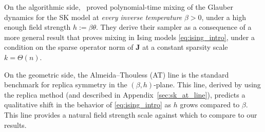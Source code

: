 \documentclass[11pt]{article}
\newcommand{\defeq}{:=}
\newcommand{\1}{\mathbf{1}}
\newcommand{\0}{\mathbf{0}}
\newcommand{\mj}{{\mathbf{J}}}
\newcommand{\vh}{{\mathbf{h}}}
\begin{document}
On the
algorithmic side,~\cite{BandeiraElAlaouiRodder26} proved polynomial-time
mixing of the Glauber dynamics for the SK model at \emph{every inverse temperature} $\beta > 0$, under a high enough field strength $h \defeq \beta\theta$. They derive their sampler as a consequence of a more general result that proves mixing in Ising models \eqref{eq:ising_intro},
under a condition on the sparse operator norm of $\mj$ at a constant sparsity scale $k = \Theta(n)$.

On the geometric side, the Almeida--Thouless (AT) line is the
standard benchmark for replica symmetry in the
\((\beta,h)\)-plane. This line, derived by \cite{deAlmeidaThouless78} using the replica method (and described in Appendix~\ref{sec:sk_at_line}), predicts a qualitative shift in the behavior of \eqref{eq:ising_intro} as $h$ grows compared to $\beta$. This line provides a
natural field strength scale against which to compare \cite{BandeiraElAlaouiRodder26}
to our results.



\end{document}
